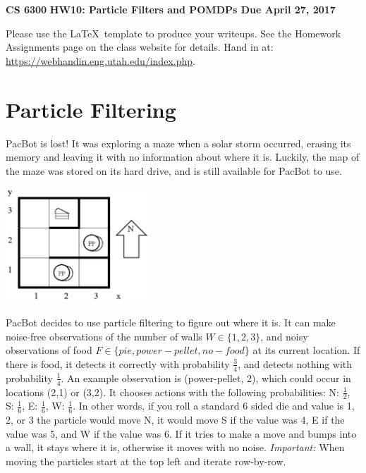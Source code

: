 \documentclass[12pt]{article}
\begin{document}
\begin{center}
{\bf CS 6300} \hfill {\large\bf HW10: Particle Filters and POMDPs \hfill Due April 27, 2017}
\end{center}

\noindent
Please use the \LaTeX\ template to produce your writeups. See the
Homework Assignments page on the class website for details.  Hand in
at: \url{https://webhandin.eng.utah.edu/index.php}.

\section{Particle Filtering}

PacBot is lost! It was exploring a maze when a solar storm occurred,
erasing its memory and leaving it with no information about where it
is. Luckily, the map of the maze was stored on its hard drive, and is
still available for PacBot to use.

\begin{center}
\includegraphics[width=0.4\textwidth]{prob1.png}
\end{center}

\noindent
PacBot decides to use particle filtering to figure out where it is. It
can make noise-free observations of the number of walls $W \in
\{1,2,3\}$, and noisy observations of food $F \in \{pie, power-pellet,
no-food\}$ at its current location.\newline
\newline
If there is food, it detects it correctly with probability
$\frac{3}{4}$, and detects nothing with probability $\frac{1}{4}$. An
example observation is (power-pellet, 2), which could occur in
locations (2,1) or (3,2).\newline
\newline
It chooses actions with the following probabilities: N: $\frac{1}{2}$,
S: $\frac{1}{6}$, E: $\frac{1}{6}$, W: $\frac{1}{6}$. In other words,
if you roll a standard 6 sided die and value is 1, 2, or 3 the
particle would move N, it would move S if the value was 4, E if the
value was 5, and W if the value was 6. If it tries to make a move and
bumps into a wall, it stays where it is, otherwise it moves with no
noise. \emph{Important:} When moving the particles start at the top
left and iterate row-by-row.
\end{document}
